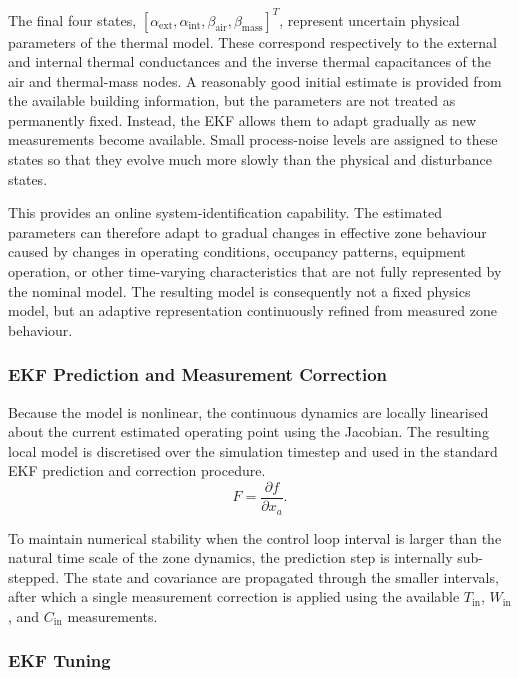 \documentclass[12pt, a4paper]{article}
\begin{document}
	The final four states, $\left[ \alpha_{\mathrm{ext}}, \alpha_{\mathrm{int}}, \beta_{\mathrm{air}}, \beta_{\mathrm{mass}} \right]^T$, represent uncertain physical parameters of the thermal model. These correspond respectively to the external and internal thermal conductances and the inverse thermal capacitances of the air and thermal-mass nodes.	A reasonably good initial estimate is provided from the available building information, but the parameters are not treated as permanently fixed. Instead, the EKF allows them to adapt gradually as new measurements become available. Small process-noise levels are assigned to these states so that they evolve much more slowly than the physical and disturbance states.
	
	This provides an online system-identification capability. The estimated parameters can therefore adapt to gradual changes in effective zone behaviour caused by changes in operating conditions, occupancy patterns, equipment operation, or other time-varying characteristics that are not fully represented by the nominal model. The resulting model is consequently not a fixed physics model, but an adaptive representation continuously refined from measured zone behaviour.
	
	\subsubsection{EKF Prediction and Measurement Correction}
	
	Because the model is nonlinear, the continuous dynamics are locally linearised about the current estimated operating point using the Jacobian. The resulting local model is discretised over the simulation timestep and used in the standard EKF prediction and correction procedure.
	\begin{equation}
		F =
		\frac{\partial f}{\partial x_a}.
	\end{equation}

	To maintain numerical stability when the control loop interval is larger than the natural time scale of the zone dynamics, the prediction step is internally sub-stepped. The state and covariance are propagated through the smaller intervals, after which a single measurement correction is applied using the available $T_{\mathrm{in}}$, $W_{\mathrm{in}}$, and $C_{\mathrm{in}}$ measurements.
	
	\subsubsection{EKF Tuning}
	
\end{document}
